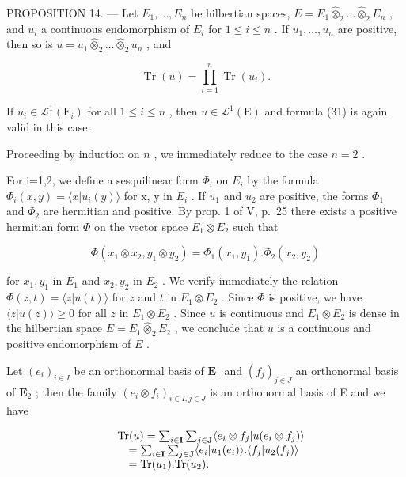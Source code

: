 PROPOSITION 14. --- Let \(E_{1}, \ldots, E_{n}\) be hilbertian spaces, \(E = E_{1} \hat{\otimes}_{2} \ldots \hat{\otimes}_{2} E_{n}\) , and \(u_{i}\) a continuous endomorphism of \(E_{i}\) for \(1 \leqslant i \leqslant n\) . If \(u_{1}, \ldots, u_{n}\) are positive, then so is \(u = u_{1} \hat{\otimes}_{2} \ldots \hat{\otimes}_{2} u_{n}\) , and

\[
\operatorname{Tr} (u) = \prod_ {i = 1} ^ {n} \operatorname{Tr} (u _ {i}).\tag{31}
\]

If \(u_{i} \in \mathcal{L}^{1}(\mathrm{E}_{i})\) for all \(1 \leqslant i \leqslant n\) , then \(u \in \mathcal{L}^{1}(\mathrm{E})\) and formula (31) is again valid in this case.

Proceeding by induction on \(n\) , we immediately reduce to the case \(n = 2\) .

For i=1,2, we define a sesquilinear form \(\Phi_{i}\) on \(E_{i}\) by the formula \(\Phi_{i}(x,y)=\langle x|u_{i}(y)\rangle\) for x, y in \(E_{i}\) . If \(u_{1}\) and \(u_{2}\) are positive, the forms \(\Phi_{1}\) and \(\Phi_{2}\) are hermitian and positive. By prop. 1 of V, p.~25 there exists a positive hermitian form \(\Phi\) on the vector space \(E_{1}\otimes E_{2}\) such that

\[
\Phi (x _ {1} \otimes x _ {2}, y _ {1} \otimes y _ {2}) = \Phi_ {1} (x _ {1}, y _ {1}). \Phi_ {2} (x _ {2}, y _ {2})
\]

for \(x_{1}, y_{1}\) in \(E_{1}\) and \(x_{2}, y_{2}\) in \(E_{2}\) . We verify immediately the relation \(\Phi(z, t) = \langle z|u(t) \rangle\) for \(z\) and \(t\) in \(E_{1} \otimes E_{2}\) . Since \(\Phi\) is positive, we have \(\langle z|u(z) \rangle \geqslant 0\) for all \(z\) in \(E_{1} \otimes E_{2}\) . Since \(u\) is continuous and \(E_{1} \otimes E_{2}\) is dense in the hilbertian space \(E = E_{1} \hat{\otimes}_{2} E_{2}\) , we conclude that \(u\) is a continuous and positive endomorphism of \(E\) .

Let \((e_i)_{i\in I}\) be an orthonormal basis of \(\mathbf{E}_1\) and \((f_j)_{j\in J}\) an orthonormal basis of \(\mathbf{E}_2\) ; then the family \((e_i\otimes f_i)_{i\in I,j\in J}\) is an orthonormal basis of E and we have

\[
\begin{array}{r l} & {\mathrm{Tr} (u) = \sum_ {i \in \mathbf {I}} \sum_ {j \in \mathbf {J}} \langle e _ {i} \otimes f _ {j} | u (e _ {i} \otimes f _ {j}) \rangle} \\ & {\quad = \sum_ {i \in \mathbf {I}} \sum_ {j \in \mathbf {J}} \langle e _ {i} | u _ {1} (e _ {i}) \rangle . \langle f _ {j} | u _ {2} (f _ {j}) \rangle} \\ & {\quad = \mathrm{Tr} (u _ {1}). \mathrm{Tr} (u _ {2}).} \end{array}
\]

